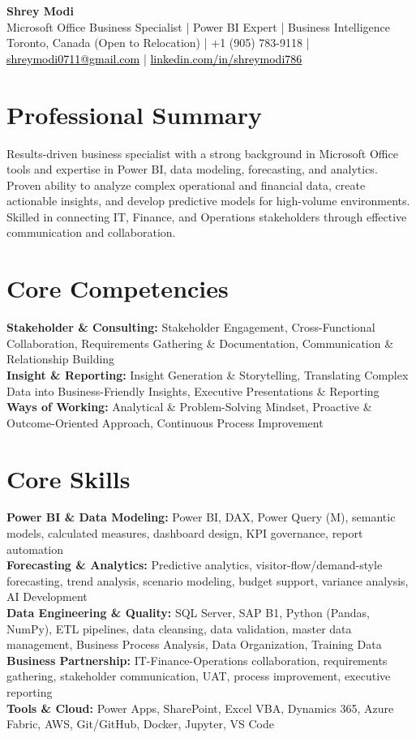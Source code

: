 \documentclass[10.5pt,letterpaper]{article}
\begin{document}
\begin{center}
  {\Huge \bfseries \color{accent} Shrey Modi}\\[0.3em]
  {\normalsize Microsoft Office Business Specialist | Power BI Expert | Business Intelligence}\\[0.1em]
  {\small
    Toronto, Canada (Open to Relocation)
 | +1 (905) 783-9118 | \href{mailto:shreymodi0711@gmail.com}{\textcolor{black}{shreymodi0711@gmail.com}} | \href{https://linkedin.com/in/shreymodi786}{\textcolor{black}{linkedin.com/in/shreymodi786}}  }
\end{center}
\vspace{-12pt}

\section{Professional Summary}
\noindent Results-driven business specialist with a strong background in Microsoft Office tools and expertise in Power BI, data modeling, forecasting, and analytics. Proven ability to analyze complex operational and financial data, create actionable insights, and develop predictive models for high-volume environments. Skilled in connecting IT, Finance, and Operations stakeholders through effective communication and collaboration.

\section{Core Competencies}
\noindent
\textbf{Stakeholder \& Consulting:} Stakeholder Engagement, Cross-Functional Collaboration, Requirements Gathering \& Documentation, Communication \& Relationship Building\\\textbf{Insight \& Reporting:} Insight Generation \& Storytelling, Translating Complex Data into Business-Friendly Insights, Executive Presentations \& Reporting\\\textbf{Ways of Working:} Analytical \& Problem-Solving Mindset, Proactive \& Outcome-Oriented Approach, Continuous Process Improvement
\section{Core Skills}
\noindent
\textbf{Power BI \& Data Modeling:} Power BI, DAX, Power Query (M), semantic models, calculated measures, dashboard design, KPI governance, report automation\\\textbf{Forecasting \& Analytics:} Predictive analytics, visitor-flow/demand-style forecasting, trend analysis, scenario modeling, budget support, variance analysis, AI Development\\\textbf{Data Engineering \& Quality:} SQL Server, SAP B1, Python (Pandas, NumPy), ETL pipelines, data cleansing, data validation, master data management, Business Process Analysis, Data Organization, Training Data\\\textbf{Business Partnership:} IT-Finance-Operations collaboration, requirements gathering, stakeholder communication, UAT, process improvement, executive reporting\\\textbf{Tools \& Cloud:} Power Apps, SharePoint, Excel VBA, Dynamics 365, Azure Fabric, AWS, Git/GitHub, Docker, Jupyter, VS Code
\end{document}
